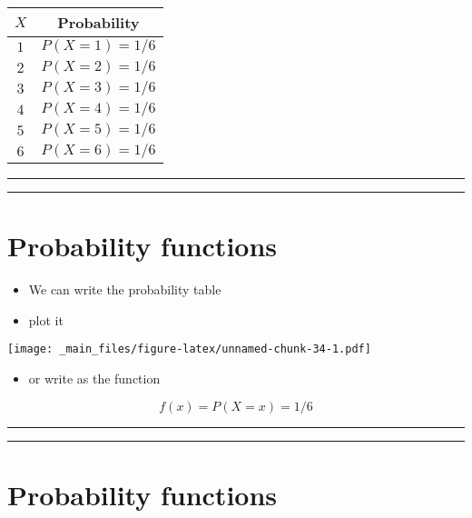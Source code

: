 \documentclass[
]{book}
\providecommand{\tightlist}{%
  \setlength{\itemsep}{0pt}\setlength{\parskip}{0pt}}
\begin{document}
\begin{longtable}[]{@{}cc@{}}
\toprule
\(X\) & Probability \\
\midrule
\endhead
\(1\) & \(P(X=1)=1/6\) \\
\(2\) & \(P(X=2)=1/6\) \\
\(3\) & \(P(X=3)=1/6\) \\
\(4\) & \(P(X=4)=1/6\) \\
\(5\) & \(P(X=5)=1/6\) \\
\(6\) & \(P(X=6)=1/6\) \\
\bottomrule
\end{longtable}

\begin{center}\rule{0.5\linewidth}{0.5pt}\end{center}

\begin{center}\rule{0.5\linewidth}{0.5pt}\end{center}

\hypertarget{probability-functions}{%
\section{Probability functions}\label{probability-functions}}

\begin{itemize}
\tightlist
\item
  We can write the probability table
\item
  plot it
\end{itemize}

\texttt{[image: \_main\_files/figure-latex/unnamed-chunk-34-1.pdf]}

\begin{itemize}
\tightlist
\item
  or write as the function
\end{itemize}

\[f(x)=P(X=x)=1/6\]

\begin{center}\rule{0.5\linewidth}{0.5pt}\end{center}

\begin{center}\rule{0.5\linewidth}{0.5pt}\end{center}

\hypertarget{probability-functions-1}{%
\section{Probability functions}\label{probability-functions-1}}
\end{document}
